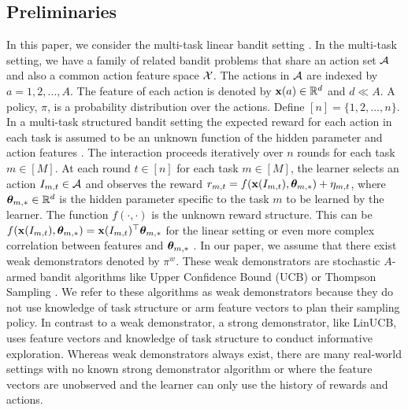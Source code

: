 \documentclass[10pt]{article}
\theoremstyle{plain}
\theoremstyle{definition}
\theoremstyle{remark}
\begin{document}
\subsection{Preliminaries}
In this paper, we consider the multi-task linear bandit setting \citep{du2023multi, yang2020impact, yang2022nearly}.
In the multi-task setting, we have a family of related bandit problems that share an action set $\mathcal{A}$ and also a common action feature space $\mathcal{X}$.
The actions in $\mathcal{A}$ are indexed by $a=1,2,\ldots, A$. The feature of each action is denoted by $\mathbf{x}(a) \in \mathbb{R}^d$ and $d \ll A$.
A policy, $\pi$, is a probability distribution over the actions.
Define $[n] = \{1,2,\ldots,n\}$.
In a multi-task structured bandit setting the expected reward for each action in each task is assumed to be an unknown function of the hidden parameter and action features \citep{lattimore2020bandit, gupta2020unified}.
The interaction proceeds iteratively over $n$ rounds for each task $m\in [M]$.
At each round $t\in [n]$ for each task $m\in [M]$, the learner selects an action $I_{m,t} \in \mathcal{A}$ and observes the reward $r_{m,t} = f(\mathbf{x}(I_{m,t}), \boldsymbol{\theta}_{m,*}) + \eta_{m,t}$, where $\boldsymbol{\theta}_{m,*}\in\mathbb{R}^d$ is the hidden parameter specific to the task $m$ to be learned by the learner. The function $f(\cdot, \cdot)$ is the unknown reward structure. This can be $f(\mathbf{x}(I_{m,t}), \boldsymbol{\theta}_{m,*}) = \mathbf{x}(I_{m,t})^\top\boldsymbol{\theta}_{m,*}$ for the linear setting or even more complex correlation between features and $\boldsymbol{\theta}_{m,*}$ \citep{filippi2010parametric, abbasi2011improved,  riquelme2018deep, lattimore2019information, dong2021provable}.
In our paper, we assume that there exist weak demonstrators denoted by $\pi^{w}$. These weak demonstrators are stochastic $A$-armed bandit algorithms like Upper Confidence Bound (UCB)  \citep{auer2002finite-time, auer2010ucb} or Thompson Sampling \citep{thompson1933likelihood,agrawal2012analysis,russo2018tutorial,zhu2020thompson}.
We refer to these algorithms as weak demonstrators because they do not use knowledge of task structure or arm feature vectors to plan their sampling policy.
In contrast to a weak demonstrator, a strong demonstrator, like LinUCB, uses feature vectors and knowledge of task structure to conduct informative exploration.
Whereas weak demonstrators always exist, there are many real-world settings with no known strong demonstrator algorithm or where the feature vectors are unobserved and the learner can only use the history of rewards and actions.
\vspace*{-1em}
\end{document}
